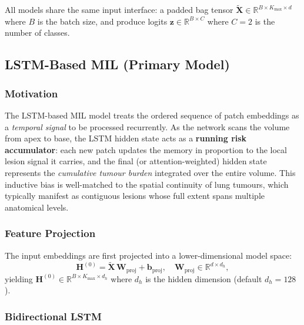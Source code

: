 \documentclass[11pt,a4paper]{article}
\begin{document}
All models share the same input interface: a padded bag tensor
$\tilde{\mathbf{X}} \in \mathbb{R}^{B \times K_{\max} \times d}$ where $B$ is the
batch size, and produce logits $\mathbf{z} \in \mathbb{R}^{B \times C}$ where
$C = 2$ is the number of classes.

\subsection{LSTM-Based MIL (Primary Model)}
\label{sec:lstm}

\subsubsection{Motivation}

The LSTM-based MIL model treats the ordered sequence of patch embeddings as a
\emph{temporal signal} to be processed recurrently. As the network scans the
volume from apex to base, the LSTM hidden state acts as a \textbf{running risk
accumulator}: each new patch updates the memory in proportion to the local lesion
signal it carries, and the final (or attention-weighted) hidden state represents
the \emph{cumulative tumour burden} integrated over the entire volume. This
inductive bias is well-matched to the spatial continuity of lung tumours, which
typically manifest as contiguous lesions whose full extent spans multiple
anatomical levels.

\subsubsection{Feature Projection}

The input embeddings are first projected into a lower-dimensional model space:
\begin{equation}
  \mathbf{H}^{(0)} = \tilde{\mathbf{X}} \,\mathbf{W}_{\text{proj}} + \mathbf{b}_{\text{proj}},
  \quad
  \mathbf{W}_{\text{proj}} \in \mathbb{R}^{d \times d_h},
\end{equation}
yielding $\mathbf{H}^{(0)} \in \mathbb{R}^{B \times K_{\max} \times d_h}$ where
$d_h$ is the hidden dimension (default $d_h = 128$).

\subsubsection{Bidirectional LSTM}
\end{document}
